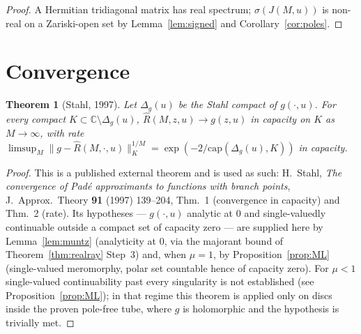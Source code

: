 \documentclass[11pt]{article}
\newtheorem{theorem}{Theorem}[section]
\theoremstyle{definition}
\begin{document}
\begin{proof}
A Hermitian tridiagonal matrix has real spectrum; $\sigma(J(M,u))$ is
non-real on a Zariski-open set by Lemma~\ref{lem:signed} and
Corollary~\ref{cor:poles}.
\end{proof}

\section{Convergence}

\begin{theorem}[Stahl, 1997]\label{thm:stahl}
Let $\Delta_{g}(u)$ be the Stahl compact of $g(\cdot,u)$. For every
compact $K \subset \mathbb{C} \setminus \Delta_{g}(u)$,
$\hat R(M,z,u) \to g(z,u)$ in capacity on $K$ as $M\to\infty$, with
rate $\limsup_{M} \|g - \hat R(M,\cdot,u)\|_{K}^{1/M}
= \exp(-2/\mathrm{cap}(\Delta_{g}(u),K))$ in capacity.
\end{theorem}

\begin{proof}
This is a published external theorem and is used as such: H.~Stahl,
\emph{The convergence of Pad\'e approximants to functions with branch
points}, J.~Approx.\ Theory \textbf{91} (1997) 139--204, Thm.~1
(convergence in capacity) and Thm.~2 (rate). Its hypotheses ---
$g(\cdot,u)$ analytic at $0$ and single-valuedly continuable outside
a compact set of capacity zero --- are supplied here by
Lemma~\ref{lem:muntz} (analyticity at $0$, via the majorant bound of
Theorem~\ref{thm:realray} Step~3) and, when $\mu = 1$, by
Proposition~\ref{prop:ML} (single-valued meromorphy, polar set
countable hence of capacity zero). For $\mu < 1$ single-valued
continuability past every singularity is not established (see
Proposition~\ref{prop:ML}); in that regime this theorem is applied
only on discs inside the proven pole-free tube, where $g$ is
holomorphic and the hypothesis is trivially met.
\end{proof}
\end{document}
